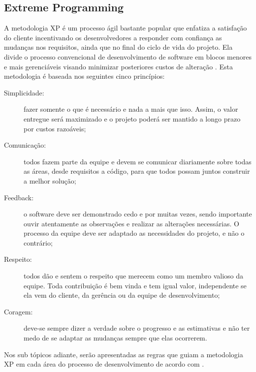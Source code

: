 \subsection{Extreme Programming}

A metodologia \gls{XP} é um processo ágil bastante popular que enfatiza a satisfação
do cliente incentivando os desenvolvedores a responder com confiança as mudanças
nos requisitos, ainda que no final do ciclo de vida do projeto. Ela divide o processo
convencional de desenvolvimento de software em blocos menores e mais gerenciáveis visando
minimizar posteriores custos de alteração \cite{Wells2000,Despa2014}. Esta metodologia é
baseada nos seguintes cinco princípios:

\begin{description}
    \item[Simplicidade:] fazer somente o que é necessário e nada a mais que isso. Assim,
    o valor entregue será maximizado e o projeto poderá ser mantido a longo prazo por
    custos razoáveis;
    \item[Comunicação:] todos fazem parte da equipe e devem se comunicar diariamente
    sobre todas as áreas, desde requisitos a código, para que todos possam juntos
    construir a melhor solução;
    \item[Feedback:] o software deve ser demonstrado cedo e por muitas vezes, sendo
    importante ouvir atentamente as observações e realizar as alterações necessárias.
    O processo da equipe deve ser adaptado as necessidades do projeto, e não o contrário;
    \item[Respeito:] todos dão e sentem o respeito que merecem como um membro valioso
    da equipe. Toda contribuição é bem vinda e tem igual valor, independente se ela vem
    do cliente, da gerência ou da equipe de desenvolvimento;
    \item[Coragem:] deve-se sempre dizer a verdade sobre o progresso e as estimativas e
    não ter medo de se adaptar as mudanças sempre que elas ocorrerem.
\end{description}

Nos sub tópicos adiante, serão apresentadas as regras que guiam a metodologia \gls{XP}
em cada área do processo de desenvolvimento de acordo com .

